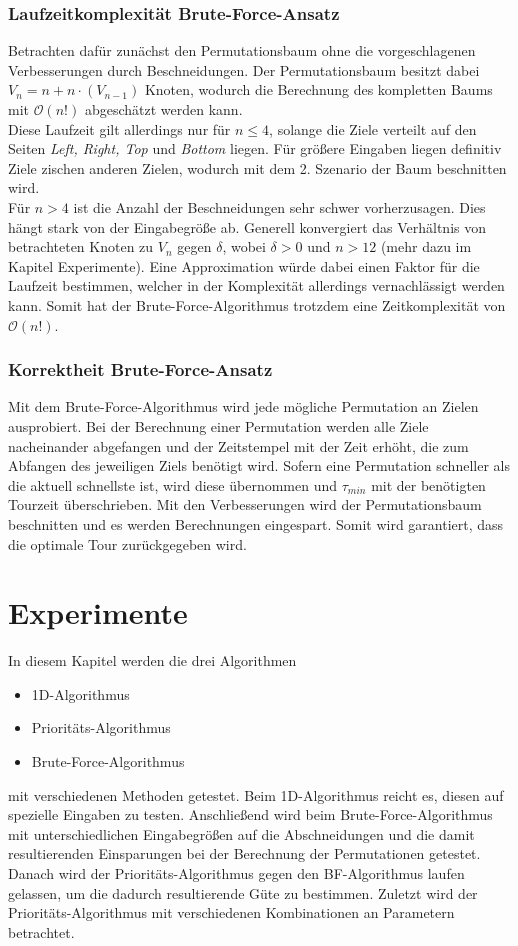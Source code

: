 \documentclass[german,version-2019-11]{uzl-thesis}
\begin{document}
\subsection{Laufzeitkomplexität Brute-Force-Ansatz}
Betrachten dafür zunächst den Permutationsbaum ohne die vorgeschlagenen Verbesserungen durch Beschneidungen. Der Permutationsbaum besitzt dabei $V_n = n + n\cdot (V_{n-1})$ Knoten, wodurch die Berechnung des kompletten Baums mit $\mathcal{O}(n!)$ abgeschätzt werden kann. \\
Diese Laufzeit gilt allerdings nur für $n\leq 4$, solange die Ziele verteilt auf den Seiten \emph{Left, Right, Top} und \emph{Bottom} liegen. Für größere Eingaben liegen definitiv Ziele zischen anderen Zielen, wodurch mit dem 2. Szenario der Baum beschnitten wird. \\
Für $n>4$ ist die Anzahl der Beschneidungen sehr schwer vorherzusagen. Dies hängt stark von der Eingabegröße ab. Generell konvergiert das Verhältnis von betrachteten Knoten zu $V_n$ gegen $\delta$, wobei $\delta>0$ und $n>12$ (mehr dazu im Kapitel Experimente). Eine Approximation würde dabei einen Faktor für die Laufzeit bestimmen, welcher in der Komplexität allerdings vernachlässigt werden kann. Somit hat der Brute-Force-Algorithmus trotzdem eine Zeitkomplexität von $\mathcal{O}(n!)$.

\subsection{Korrektheit Brute-Force-Ansatz}
Mit dem Brute-Force-Algorithmus wird jede mögliche Permutation an Zielen ausprobiert. Bei der Berechnung einer Permutation werden alle Ziele nacheinander abgefangen und der Zeitstempel mit der Zeit erhöht, die zum Abfangen des jeweiligen Ziels benötigt wird. Sofern eine Permutation schneller als die aktuell schnellste ist, wird diese übernommen und $\tau_{min}$ mit der benötigten Tourzeit überschrieben. Mit den Verbesserungen wird der Permutationsbaum beschnitten und es werden Berechnungen eingespart. Somit wird garantiert, dass die optimale Tour zurückgegeben wird.


\chapter{Experimente}

In diesem Kapitel werden die drei Algorithmen
\begin{itemize}
\item 1D-Algorithmus
\item Prioritäts-Algorithmus
\item Brute-Force-Algorithmus
\end{itemize}
mit verschiedenen Methoden getestet. Beim 1D-Algorithmus reicht es, diesen auf spezielle Eingaben zu testen. Anschließend wird beim Brute-Force-Algorithmus mit unterschiedlichen Eingabegrößen auf die Abschneidungen und die damit resultierenden Einsparungen bei der Berechnung der Permutationen getestet. Danach wird der Prioritäts-Algorithmus gegen den BF-Algorithmus laufen gelassen, um die dadurch resultierende Güte zu bestimmen. Zuletzt wird der Prioritäts-Algorithmus mit verschiedenen Kombinationen an Parametern betrachtet. 
\end{document}
